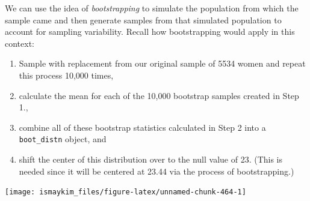\documentclass[12pt,]{krantz}
\makeatletter
\newenvironment{Shaded}{\begin{snugshade}}{\end{snugshade}}
\newcommand{\KeywordTok}[1]{\textcolor[rgb]{0.27,0.27,0.27}{\textbf{#1}}}
\newcommand{\DataTypeTok}[1]{\textcolor[rgb]{0.27,0.27,0.27}{#1}}
\newcommand{\DecValTok}[1]{\textcolor[rgb]{0.06,0.06,0.06}{#1}}
\newcommand{\StringTok}[1]{\textcolor[rgb]{0.5,0.5,0.5}{#1}}
\newcommand{\OperatorTok}[1]{\textcolor[rgb]{0.43,0.43,0.43}{\textbf{#1}}}
\newcommand{\NormalTok}[1]{#1}
\providecommand{\tightlist}{%
  \setlength{\itemsep}{0pt}\setlength{\parskip}{0pt}}
\newenvironment{kframe}{%
\medskip{}
\setlength{\fboxsep}{.8em}
 \def\at@end@of@kframe{}%
 \ifinner\ifhmode%
  \def\at@end@of@kframe{\end{minipage}}%
  \begin{minipage}{\columnwidth}%
 \fi\fi%
 \def\FrameCommand##1{\hskip\@totalleftmargin \hskip-\fboxsep
 \colorbox{shadecolor}{##1}\hskip-\fboxsep
     \hskip-\linewidth \hskip-\@totalleftmargin \hskip\columnwidth}%
 \MakeFramed {\advance\hsize-\width
   \@totalleftmargin\z@ \linewidth\hsize
   \@setminipage}}%
 {\par\unskip\endMakeFramed%
 \at@end@of@kframe}
\renewenvironment{Shaded}{\begin{kframe}}{\end{kframe}}
\theoremstyle{definition}
\theoremstyle{definition}
\theoremstyle{definition}
\theoremstyle{remark}
\makeatother
\begin{document}
We can use the idea of \emph{bootstrapping} to simulate the population
from which the sample came and then generate samples from that simulated
population to account for sampling variability. Recall how bootstrapping
would apply in this context:

\begin{enumerate}
\def\labelenumi{\arabic{enumi}.}
\tightlist
\item
  Sample with replacement from our original sample of 5534 women and
  repeat this process 10,000 times,
\item
  calculate the mean for each of the 10,000 bootstrap samples created in
  Step 1.,
\item
  combine all of these bootstrap statistics calculated in Step 2 into a
  \texttt{boot\_distn} object, and
\item
  shift the center of this distribution over to the null value of 23.
  (This is needed since it will be centered at 23.44 via the process of
  bootstrapping.)
\end{enumerate}

\begin{Shaded}
\end{Shaded}

\begin{Shaded}
\end{Shaded}

\begin{center}\texttt{[image: ismaykim\_files/figure-latex/unnamed-chunk-464-1]} \end{center}
\end{document}
